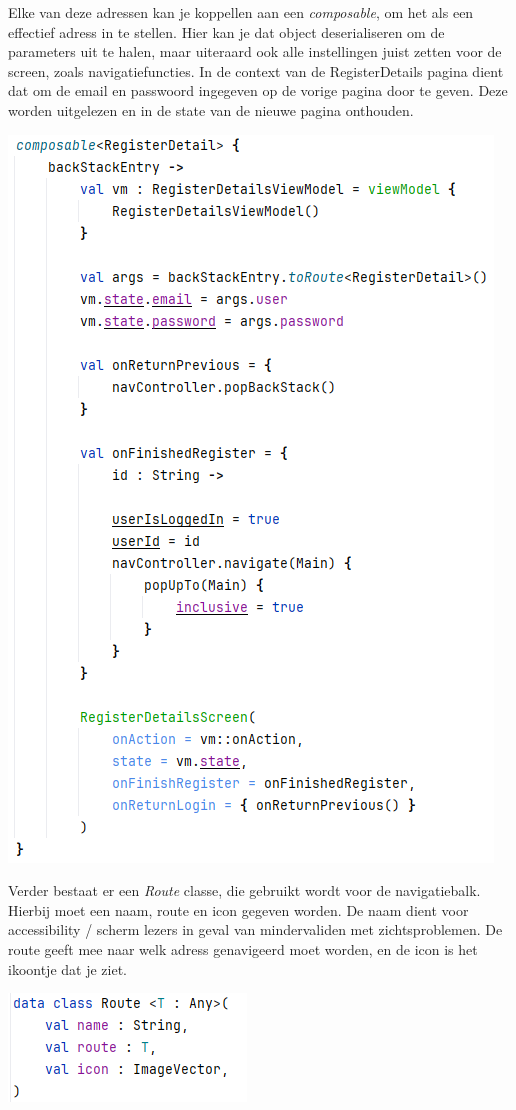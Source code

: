 \documentclass{report}
\begin{document}
Elke van deze adressen kan je koppellen aan een \textit{composable}, om het als een effectief adress in te stellen.
Hier kan je dat object deserialiseren om de parameters uit te halen, maar uiteraard ook alle instellingen juist zetten voor de screen, zoals navigatiefuncties.
In de context van de RegisterDetails pagina dient dat om de email en passwoord ingegeven op de vorige pagina door te geven.
Deze worden uitgelezen en in de state van de nieuwe pagina onthouden.
\begin{center}
    \includegraphics[scale=0.8]{NAV_Composable}
\end{center}

Verder bestaat er een \textit{Route} classe, die gebruikt wordt voor de navigatiebalk.
Hierbij moet een naam, route en icon gegeven worden.
De naam dient voor accessibility / scherm lezers in geval van mindervaliden met zichtsproblemen.
De route geeft mee naar welk adress genavigeerd moet worden, en de icon is het ikoontje dat je ziet.
\begin{center}
    \includegraphics{NAV_Route}
\end{center}
\end{document}
